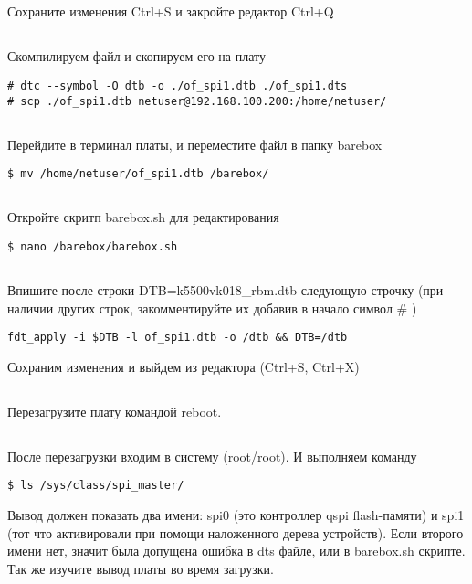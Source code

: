 \subsection{}Сохраните изменения Ctrl+S и закройте редактор Ctrl+Q 

\subsection{}Скомпилируем файл и скопируем его на плату
\begin{lstlisting}[style=bash]
# dtc --symbol -O dtb -o ./of_spi1.dtb ./of_spi1.dts
# scp ./of_spi1.dtb netuser@192.168.100.200:/home/netuser/
\end{lstlisting}

\subsection{}Перейдите в терминал платы, и переместите файл в папку barebox
\begin{lstlisting}[style=bash]
$ mv /home/netuser/of_spi1.dtb /barebox/
\end{lstlisting}

\subsection{}Откройте скритп barebox.sh для редактирования
\begin{lstlisting}[style=bash]
$ nano /barebox/barebox.sh
\end{lstlisting}

\subsection{}Впишите после строки DTB=k5500vk018\_rbm.dtb следующую строчку (при наличии других строк, закомментируйте их добавив в начало символ \# )
\begin{lstlisting}[style=stdout]
fdt_apply -i $DTB -l of_spi1.dtb -o /dtb && DTB=/dtb
\end{lstlisting}
Сохраним изменения и выйдем из редактора (Ctrl+S, Ctrl+X)

\subsection{}Перезагрузите плату командой reboot. 

\subsection{}После перезагрузки входим в систему (root/root). И выполняем команду
\begin{lstlisting}[style=bash]
$ ls /sys/class/spi_master/
\end{lstlisting}
Вывод должен показать два имени: spi0 (это контроллер qspi flash-памяти) и spi1 (тот что активировали при помощи наложенного дерева устройств). Если второго имени нет, значит была допущена ошибка в dts файле, или в barebox.sh скрипте. Так же изучите вывод платы во время загрузки. 

